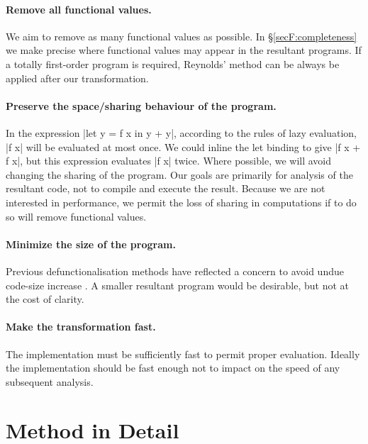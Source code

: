 \paragraph{Remove all functional values.} We aim to remove as many functional values as possible. In \S\ref{secF:completeness} we make precise where functional values may appear in the resultant programs. If a totally first-order program is required, Reynolds' method can be always be applied after our transformation.

\paragraph{Preserve the space/sharing behaviour of the program.} In the expression |let y = f x in y + y|, according to the rules of lazy evaluation, |f x| will be evaluated at most once. We could inline the let binding to give |f x + f x|, but this expression evaluates |f x| twice. Where possible, we will avoid changing the sharing of the program. Our goals are primarily for analysis of the resultant code, not to compile and execute the result. Because we are not interested in performance, we permit the loss of sharing in computations if to do so will remove functional values.

\paragraph{Minimize the size of the program.} Previous defunctionalisation methods have reflected a concern to avoid undue code-size increase \cite{chin:higher_order_removal}. A smaller resultant program would be desirable, but not at the cost of clarity.

\paragraph{Make the transformation fast.} The implementation must be sufficiently fast to permit proper evaluation. Ideally the implementation should be fast enough not to impact on the speed of any subsequent analysis.


\section{Method in Detail}
\label{secF:detailed}

\begin{comment}
\begin{code}
data Prog = Prog deriving Eq
simplify,arity,inline,specialise :: Prog -> Prog
\end{code}
\end{comment}


